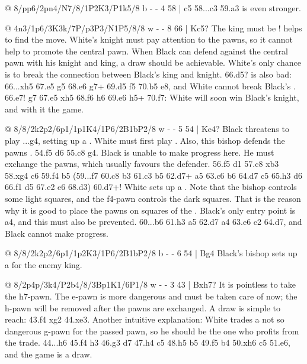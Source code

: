 @ 8/pp6/2pn4/N7/8/1P2K3/P1k5/8 b - - 4 58 | c5
58...\K c3 59.a3 is even stronger.

@ 4n3/1p6/3K3k/7P/p3P3/N1P5/8/8 w - - 8 66 | Kc5?
The king must be !
 helps to find the move. White's
knight must pay attention to the pawns, so it cannot help to promote the central pawn. When Black
can defend against the central pawn with his knight and king, a draw should be achievable. White's
only chance is to break the connection between Black's king and knight. 66.\K d5? is also bad:
66...\K xh5 67.e5 \K g5 68.\K e6 \N g7+ 69.\K d5 \K f5 70.\N b5 \N e8, and White cannot break
Black's . 66.\K e7! \N g7 67.e5 \K xh5 68.\K f6 \K h6 69.e6 \N h5+
70.\K f7: White will soon win Black's knight, and with it the game.

@ 8/8/2k2p2/6p1/1p1K4/1P6/2B1bP2/8 w - - 5 54 | Ke4?
Black threatens to play ...\B g4, setting up a . White must
first play . Also, this bishop defends the pawns
. 54.\B f5 \K d6
55.\B c8 g4. Black is unable to make progress here. He must exchange the pawns, which usually
favours the defender. 56.\B f5 \B d1
57.\B c8 \B xb3 58.\B xg4 \K c6 59.f4 \K b5 (59...\B f7 60.\B c8 b3 61.\K c3 \K b5 62.\B d7+
\K a5 63.\B c6 \K b6 64.\B d7 \K c5 65.\B h3 \K d6 66.\B f1 \B d5 67.\B e2 \K e6 68.\B d3)
60.\B d7+! White sets up a . Note that the bishop controls
some light squares, and the f4-pawn controls the dark squares. That is the reason why it is good
to place the pawns on squares of the
. Black's only entry point is
a4, and this must also be prevented. 60...\K b6 61.\B h3 \K a5 62.\B d7 \B a4 63.\B e6 \B c2
64.\B d7, and Black cannot make progress.

@ 8/8/2k2p2/6p1/1p2K3/1P6/2B1bP2/8 b - - 6 54 | Bg4
Black's bishop sets up a  for the enemy king.

@ 8/2p4p/3k4/P2b4/8/3Bp1K1/6P1/8 w - - 3 43 | Bxh7?
It is pointless to take the h7-pawn. The e-pawn is more dangerous and must be taken care of now;
the h-pawn will be removed after the pawns are exchanged.
A draw is simple to reach: 43.\K f4 \B xg2 44.\K xe3. Another intuitive explanation: White trades
a not so dangerous g-pawn for the passed pawn, so he should be the one who profits from the trade.
44...h6 45.\K f4 \B h3 46.\K g3 \B d7 47.\K h4 \K c5 48.\K h5 \B b5 49.\B f5 \K b4 50.\K xh6 c5
51.\B e6, and the game is a draw.

